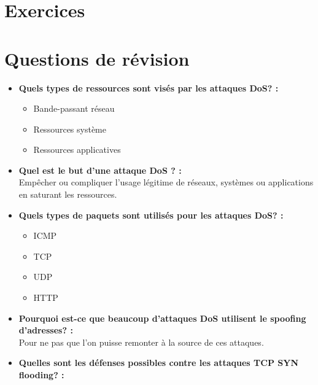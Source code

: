 \documentclass{report}
\begin{document}
	\section{Exercices}

		\section{Questions de révision}

			\begin{itemize}
				\item \textbf{Quels types de ressources sont visés par les attaques DoS? : }\\

					\begin{itemize}
						\item Bande-passant réseau
						\item Ressources système
						\item Ressources applicatives
					\end{itemize}

				\item \textbf{Quel est le but d'une attaque DoS ? :}\\

					Empêcher ou compliquer l'usage légitime de réseaux, systèmes ou applications en saturant les ressources.\\

				\item \textbf{Quels types de paquets sont utilisés pour les attaques DoS? :}\\

					\begin{itemize}
						\item ICMP
						\item TCP
						\item UDP
						\item HTTP	
					\end{itemize}

				\item \textbf{Pourquoi est-ce que beaucoup d'attaques DoS utilisent le spoofing d'adresses? : }\\

					Pour ne pas que l'on puisse remonter à la source de ces attaques.\\

				\item \textbf{Quelles sont les défenses possibles contre les attaques TCP SYN flooding? : }\\


\end{itemize}
\end{document}
